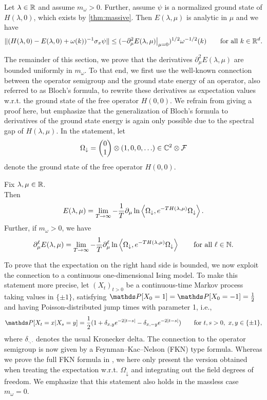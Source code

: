 \documentclass[a4paper,12pt,oneside]{article}
\newcommand{\Od}{{\Omega_\downarrow}}
\begin{document}
\begin{thm}\label{thm:resder}
 	Let $\lambda\in{\mathbb R}$ and assume $m_\omega>0$. Further, assume $\psi$ is a normalized ground state of $H(\lambda,0)$, which exists by \cref{thm:massive}.
 	Then $E(\lambda,\mu)$ is analytic in $\mu$ and we have \[ \|(H(\lambda,0)-E(\lambda,0)+\omega(k))^{-1}\sigma_x\psi\| \le (-\partial_\mu^2E(\lambda,\mu)\big|_{\mu=0})^{1/2}  \omega^{-1/2}(k) \qquad\mbox{for all}\ k\in{\mathbb R}^d. \]
\end{thm}
%
The remainder of this section, we prove that the derivatives $\partial_\mu^2 E(\lambda,\mu)$ are bounded uniformly in $m_\omega$. To that end, we first use the well-known connection between the operator  semigroup and the ground state energy of an operator, also referred to as Bloch's formula, to rewrite these derivatives as expectation values w.r.t. the ground state of the free operator $H(0,0)$. We refrain from giving a proof here, but emphasize that the generalization of Bloch's formula to derivatives of the ground state energy is again only possible due to the spectral gap of $H(\lambda,\mu)$. In the statement, let
\[\Od = \begin{pmatrix}0\\1\end{pmatrix} \otimes (1,0,0,\ldots)\in\IC^2\otimes \FS  \]
denote the ground state of the free operator $H(0,0)$.
\begin{thm}\label{thm:semigroup}Fix $\lambda,\mu\in{\mathbb R}$.\\
	Then
	\[ E(\lambda,\mu) = \lim_{T\to \infty} -\frac 1T\partial_\mu \ln\Braket{\Od,e^{-TH(\lambda,\mu)}\Od}.  \]
	Further, if $m_\omega>0$, we have
	\[ \partial_\mu^\ell E(\lambda,\mu) = \lim_{T\to \infty} -\frac 1T\partial_\mu^\ell \ln\Braket{\Od,e^{-TH(\lambda,\mu)}\Od} \qquad\mbox{for all}\ \ell\in\IN. \]
\end{thm}
%
To prove that the expectation on the right hand side is bounded, we now exploit the connection to a continuous one-dimensional Ising model. To make this statement more precise, let $(X_t)_{t>0}$ be a continuous-time Markov process taking values in $\{\pm 1\}$, satisfying $\PP[X_0=1]=\PP[X_0=-1]=\frac 12$ and having Poisson-distributed jump times with parameter 1, i.e.,
\[ \PP[X_t=x|X_s=y] = \frac 12 (1+\delta_{x,y}e^{-2|t-s|}-\delta_{x,-y}e^{-2|t-s|}) \qquad\mbox{for}\ t,s>0,\ x,y\in\{\pm 1\}, \]
where $\delta_{\cdot,\cdot}$ denotes the usual Kronecker delta.
The connection to the operator semigroup is now given by a Feynman--Kac--Nelson (FKN) type formula. Whereas we prove the full FKN formula in \cite{HaslerHinrichsSiebert.2021c}, we here only present the version obtained when treating the expectation w.r.t. $\Od$ and integrating out the field degrees of freedom. We emphasize that this statement also holds in the massless case $m_\omega=0$.
\end{document}

